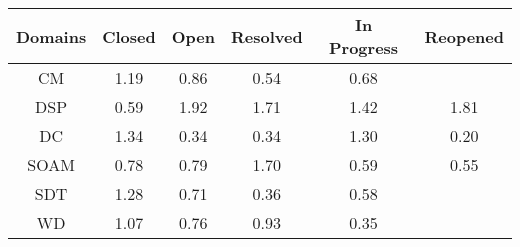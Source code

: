 \begin{tabular}{|c||c|c|c|c|c|}
\hline
Domains & Closed & Open & Resolved & In Progress & Reopened \\ 
\hline
CM & \cellcolor[rgb]{0.8296594371076592,0.8019439438931018,0.42} 1.19 & \cellcolor[rgb]{0.8829628543956811,0.7120241774728899,0.39476533076930226} 0.86 & \cellcolor[rgb]{0.822668145386041,0.4266292214939277,0.33849026902697166} 0.54 & \cellcolor[rgb]{0.850679527490317,0.5592164301208337,0.36463422565762915} 0.68 &  \\ 
\hline
DSP & \cellcolor[rgb]{0.8331218785026875,0.4761102249127202,0.34824708660250825} 0.59 & \cellcolor[rgb]{0.53,0.66,0.42} 1.92 & \cellcolor[rgb]{0.6155722232728096,0.7005342110239624,0.42} 1.71 & \cellcolor[rgb]{0.7374833090337715,0.7582815674370496,0.42} 1.42 & \cellcolor[rgb]{0.575151885826416,0.6813877353914602,0.42} 1.81 \\ 
\hline
DC & \cellcolor[rgb]{0.7676165863507245,0.772555225113501,0.42000000000000004} 1.34 & \cellcolor[rgb]{0.7868287976297066,0.2569896421139445,0.3050402111210595} 0.34 & \cellcolor[rgb]{0.7852127839741767,0.2493405108111027,0.30353193170923154} 0.34 & \cellcolor[rgb]{0.7878643707825475,0.7821462808969961,0.42} 1.30 & \cellcolor[rgb]{0.76,0.13,0.28} 0.20 \\ 
\hline
SOAM & \cellcolor[rgb]{0.8695466529384003,0.6485208239084277,0.3822435427425069} 0.78 & \cellcolor[rgb]{0.8699352331696278,0.6503601036695716,0.382606217624986} 0.79 & \cellcolor[rgb]{0.6210712852625937,0.7031390298612286,0.42} 1.70 & \cellcolor[rgb]{0.832299739575574,0.47221876732438384,0.34747975693720246} 0.59 & \cellcolor[rgb]{0.8252081503882134,0.4386519118375434,0.3408609403623325} 0.55 \\ 
\hline
SDT & \cellcolor[rgb]{0.7934930039438368,0.7848124755523438,0.42000000000000004} 1.28 & \cellcolor[rgb]{0.8545757029977858,0.5776583275228526,0.36827065613126675} 0.71 & \cellcolor[rgb]{0.7902148402376815,0.27301691045835874,0.30820051755516936} 0.36 & \cellcolor[rgb]{0.8315551040615397,0.4686941592246209,0.34678476379077033} 0.58 &  \\ 
\hline
WD & \cellcolor[rgb]{0.8819930104589229,0.826733531270016,0.42} 1.07 & \cellcolor[rgb]{0.8654749087689988,0.629247901506594,0.37844324818439884} 0.76 & \cellcolor[rgb]{0.8967817000412227,0.7774333801951206,0.4076629200384745} 0.93 & \cellcolor[rgb]{0.7876951023451015,0.261090151100147,0.3058487621887614} 0.35 &  \\ 
\hline
\end{tabular}